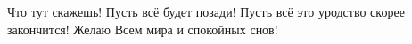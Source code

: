  
 
 
 
 

\qqSecCmt


Что тут скажешь! Пусть всё будет позади! Пусть всё это уродство скорее
закончится! Желаю Всем мира и спокойных снов!

